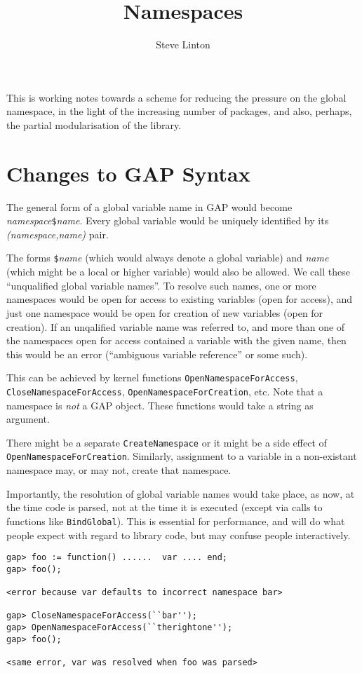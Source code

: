 \documentclass{article}
\title{Namespaces}
\author{Steve Linton}
\begin{document}
\maketitle

This is working notes towards a scheme for reducing the pressure on
the global namespace, in the light of the increasing number of
packages, and also, perhaps, the partial modularisation of the
library.

\section{Changes to GAP Syntax}

The general form of a  global variable name in GAP would become
\textit{namespace\/}\verb|$|\textit{name}. Every global variable would
be uniquely identified by its \textit{(namespace,name)} pair.

The forms \verb|$|\textit{name} (which would always denote a global
variable) and \textit{name} (which might be a local or higher
variable) would also be allowed. We call these ``unqualified global
variable names''.  To resolve such names, one or more namespaces would
be open for access to existing variables (open for access), and just one namespace would
be open for creation of new variables (open for creation). If an
unqalified variable name was referred to, and more than one of the
namespaces open for access contained a variable with the given name,
then this would be an error (``ambiguous variable reference'' or some
such).

This can be achieved by kernel functions
\verb|OpenNamespaceForAccess|, \verb|CloseNamespaceForAccess|,
\verb|OpenNamespaceForCreation|, etc. Note that a namespace is
\emph{not} a GAP object. These functions would take a string as
argument. 

There might be a separate \verb|CreateNamespace| or it might be a side
effect of \verb|OpenNamespaceForCreation|. Similarly, assignment to a
variable in a non-existant namespace may, or may not, create that namespace.

Importantly, the resolution of global variable names would take place,
as now, at the time code is parsed, not at the time it is executed
(except via calls to functions like \verb|BindGlobal|). This is
essential for performance, and will do what people expect with regard
to library code, but may confuse people interactively.

\begin{verbatim}
gap> foo := function() ......  var .... end;
gap> foo();

<error because var defaults to incorrect namespace bar>

gap> CloseNamespaceForAccess(``bar'');
gap> OpenNamespaceForAccess(``therightone'');
gap> foo();

<same error, var was resolved when foo was parsed>
\end{verbatim}
\end{document}

